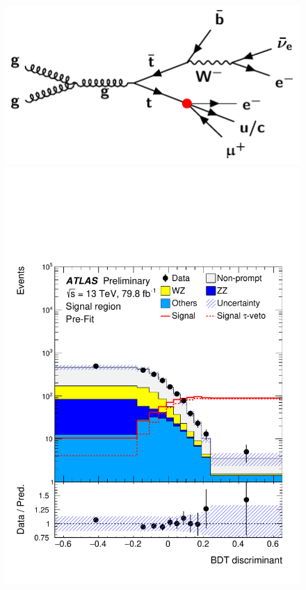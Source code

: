 \begin{figure}[tbh!]
 \begin{center}
 \begin{minipage}[b]{0.325\linewidth} 
 \includegraphics[width=\textwidth]{figures/TT} 
 \vspace{2em}
 \end{minipage}
 \hfill
 \begin{minipage}[b]{0.325\linewidth} 
 \includegraphics[width=\textwidth]{figures/Part3/History/ATLAS_results1}

\end{minipage}
\end{center}
\end{figure}
